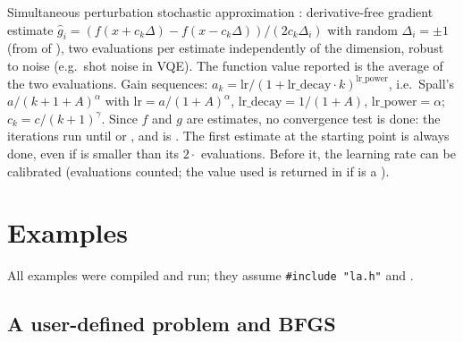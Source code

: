 Simultaneous perturbation stochastic approximation \cite{optimize:spall1992,optimize:spall1998}: derivative-free gradient estimate
$\hat g_i=(f(x+c_k\Delta)-f(x-c_k\Delta))/(2c_k\Delta_i)$ with random $\Delta_i=\pm1$ (from  of ),
two evaluations per estimate independently of the dimension, robust to noise (e.g.\ shot noise in VQE). The function value
reported is the average of the two evaluations. Gain sequences: $a_k=\mathrm{lr}/(1+\mathrm{lr\_decay}\cdot k)^{\mathrm{lr\_power}}$,
i.e.\ Spall's $a/(k+1+A)^\alpha$ with $\mathrm{lr}=a/(1+A)^\alpha$, $\mathrm{lr\_decay}=1/(1+A)$, $\mathrm{lr\_power}=\alpha$;
$c_k=c/(k+1)^\gamma$. Since $f$ and $g$ are estimates, no convergence test is done: the iterations run until 
or , and  is . The first estimate at the starting point is always done, even if
 is smaller than its $2\cdot$ evaluations. Before it, the learning rate can be calibrated
(evaluations counted; the value used is returned in  if  is a
).
\begin{lareference}
\end{lareference}

\section{Examples}\label{sec:optimize:examples}

All examples were compiled and run; they assume \texttt{\#include "la.h"} and .

\subsection{A user-defined problem and BFGS}

